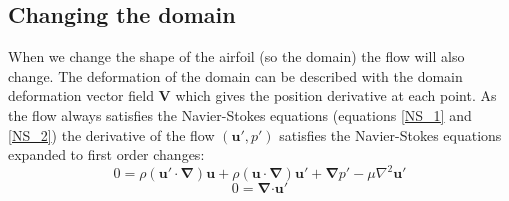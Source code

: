 \documentclass[12pt, a4paper]{article}
\begin{document}
    \subsection{Changing the domain}
        When we change the shape of the airfoil (so the domain) the flow will also change. The deformation of the domain can be described with the domain deformation vector field $\mathbf{V}$ which gives the position derivative at each point. As the flow always satisfies the Navier-Stokes equations (equations \ref{NS_1} and \ref{NS_2}) the derivative of the flow $(\mathbf{u'}, p')$ satisfies the Navier-Stokes equations expanded to first order changes:
        \begin{equation} \label{NS_der_1}
            0 = \rho (\mathbf{u' \cdot} \boldsymbol{\nabla}) \mathbf{u} + 
                \rho (\mathbf{u \cdot} \boldsymbol{\nabla}) \mathbf{u'} + 
                \boldsymbol{\nabla} p' - 
                \mu \nabla^2 \mathbf{u'}
        \end{equation}
        \begin{equation} \label{NS_der_2}
        0 = \boldsymbol{\nabla} \mathbf{\cdot u'}
        \end{equation}
        
\end{document}
